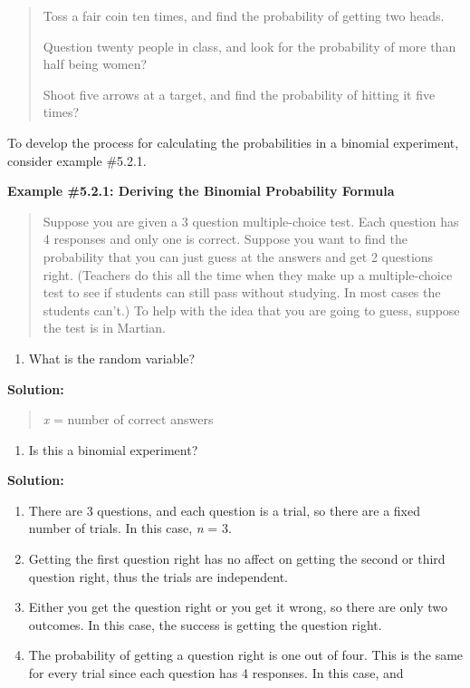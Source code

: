 \documentclass[]{book}
\providecommand{\tightlist}{%
  \setlength{\itemsep}{0pt}\setlength{\parskip}{0pt}}
\begin{document}
\begin{quote}
Toss a fair coin ten times, and find the probability of getting two
heads.

Question twenty people in class, and look for the probability of more
than half being women?

Shoot five arrows at a target, and find the probability of hitting it
five times?
\end{quote}

To develop the process for calculating the probabilities in a binomial
experiment, consider example \#5.2.1.

\textbf{Example \#5.2.1: Deriving the Binomial Probability Formula}

\begin{quote}
Suppose you are given a 3 question multiple-choice test. Each question
has 4 responses and only one is correct. Suppose you want to find the
probability that you can just guess at the answers and get 2 questions
right. (Teachers do this all the time when they make up a
multiple-choice test to see if students can still pass without
studying. In most cases the students can't.) To help with the idea
that you are going to guess, suppose the test is in Martian.
\end{quote}

\begin{enumerate}
\def\labelenumi{\alph{enumi}.}
\tightlist
\item
  What is the random variable?
\end{enumerate}

\textbf{Solution:}

\begin{quote}
\emph{x} = number of correct answers
\end{quote}

\begin{enumerate}
\def\labelenumi{\alph{enumi}.}
\setcounter{enumi}{1}
\tightlist
\item
  Is this a binomial experiment?
\end{enumerate}

\textbf{Solution:}

\begin{enumerate}
\def\labelenumi{\arabic{enumi}.}
\item
  There are 3 questions, and each question is a trial, so there are a
  fixed number of trials. In this case, \emph{n} = 3.
\item
  Getting the first question right has no affect on getting the second
  or third question right, thus the trials are independent.
\item
  Either you get the question right or you get it wrong, so there are
  only two outcomes. In this case, the success is getting the question
  right.
\item
  The probability of getting a question right is one out of four. This
  is the same for every trial since each question has 4 responses. In
  this case, and
\end{enumerate}
\end{document}
